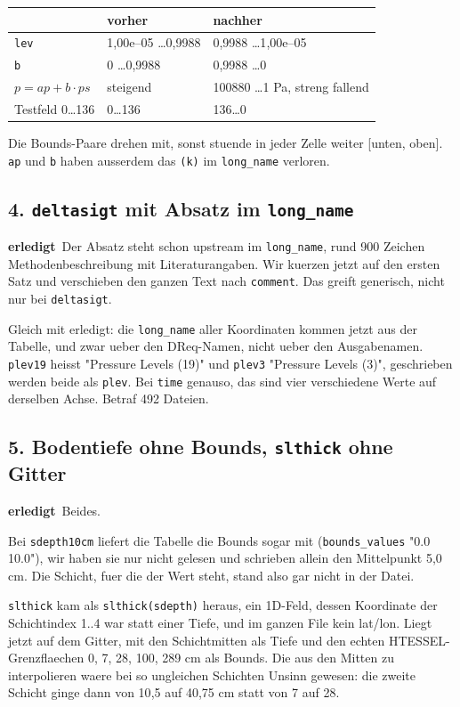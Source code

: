 \documentclass[11pt,a4paper]{article}
\newcommand{\code}[1]{\texttt{\small #1}}
\newcommand{\ok}{\textcolor{green!45!black}{\textbf{erledigt}}}
\begin{document}
\begin{center}
\begin{tabular}{lll}
\toprule
& \textbf{vorher} & \textbf{nachher} \\
\midrule
\code{lev}            & 1{,}00e--05 \dots 0{,}9988 & 0{,}9988 \dots 1{,}00e--05 \\
\code{b}              & 0 \dots 0{,}9988 & 0{,}9988 \dots 0 \\
$p = ap + b \cdot ps$ & steigend & 100880 \dots 1 Pa, streng fallend \\
Testfeld 0\dots136    & 0\dots136 & 136\dots0 \\
\bottomrule
\end{tabular}
\end{center}

Die Bounds-Paare drehen mit, sonst stuende in jeder Zelle weiter [unten, oben].
\code{ap} und \code{b} haben ausserdem das \code{(k)} im \code{long\_name} verloren.

\subsection*{4. \code{deltasigt} mit Absatz im \code{long\_name}}
\ok\ Der Absatz steht schon upstream im \code{long\_name}, rund 900 Zeichen
Methodenbeschreibung mit Literaturangaben. Wir kuerzen jetzt auf den ersten Satz und
verschieben den ganzen Text nach \code{comment}. Das greift generisch, nicht nur bei
\code{deltasigt}.

Gleich mit erledigt: die \code{long\_name} aller Koordinaten kommen jetzt aus der
Tabelle, und zwar ueber den DReq-Namen, nicht ueber den Ausgabenamen. \code{plev19}
heisst "Pressure Levels (19)" und \code{plev3} "Pressure Levels (3)", geschrieben
werden beide als \code{plev}. Bei \code{time} genauso, das sind vier verschiedene
Werte auf derselben Achse. Betraf 492 Dateien.

\subsection*{5. Bodentiefe ohne Bounds, \code{slthick} ohne Gitter}
\ok\ Beides.

Bei \code{sdepth10cm} liefert die Tabelle die Bounds sogar mit
(\code{bounds\_values} "0.0 10.0"), wir haben sie nur nicht gelesen und schrieben
allein den Mittelpunkt 5{,}0 cm. Die Schicht, fuer die der Wert steht, stand also gar
nicht in der Datei.

\code{slthick} kam als \code{slthick(sdepth)} heraus, ein 1D-Feld, dessen Koordinate
der Schichtindex 1..4 war statt einer Tiefe, und im ganzen File kein lat/lon. Liegt
jetzt auf dem Gitter, mit den Schichtmitten als Tiefe und den echten
HTESSEL-Grenzflaechen 0, 7, 28, 100, 289 cm als Bounds. Die aus den Mitten zu
interpolieren waere bei so ungleichen Schichten Unsinn gewesen: die zweite Schicht
ginge dann von 10{,}5 auf 40{,}75 cm statt von 7 auf 28.
\end{document}

